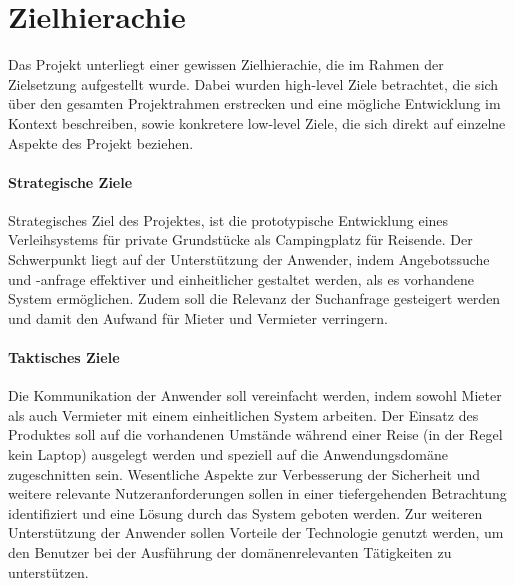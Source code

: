 
\chapter{Zielhierachie}
Das Projekt unterliegt einer gewissen Zielhierachie, die im Rahmen der Zielsetzung aufgestellt wurde. Dabei wurden high-level Ziele betrachtet, die sich über den gesamten Projektrahmen erstrecken und eine mögliche Entwicklung im Kontext beschreiben, sowie konkretere low-level Ziele, die sich direkt auf einzelne Aspekte des Projekt beziehen.

\subsubsection{Strategische Ziele}
Strategisches Ziel des Projektes, ist die prototypische Entwicklung eines Verleihsystems für private Grundstücke als Campingplatz für Reisende. Der Schwerpunkt liegt auf der Unterstützung der Anwender, indem Angebotssuche und -anfrage effektiver und einheitlicher gestaltet werden, als es vorhandene System ermöglichen. Zudem soll die Relevanz der Suchanfrage gesteigert werden und damit den Aufwand für Mieter und Vermieter verringern. 

\subsubsection{Taktisches Ziele}
Die Kommunikation der Anwender soll vereinfacht werden, indem sowohl Mieter als auch Vermieter mit einem einheitlichen System arbeiten. Der Einsatz des Produktes soll auf die vorhandenen Umstände während einer Reise (in der Regel kein Laptop) ausgelegt werden und speziell auf die Anwendungsdomäne zugeschnitten sein. Wesentliche Aspekte zur Verbesserung der Sicherheit und weitere relevante Nutzeranforderungen sollen in einer tiefergehenden Betrachtung identifiziert und eine Lösung durch das System geboten werden. Zur weiteren Unterstützung der Anwender sollen Vorteile der Technologie genutzt werden, um den Benutzer bei der Ausführung der domänenrelevanten Tätigkeiten zu unterstützen. 

